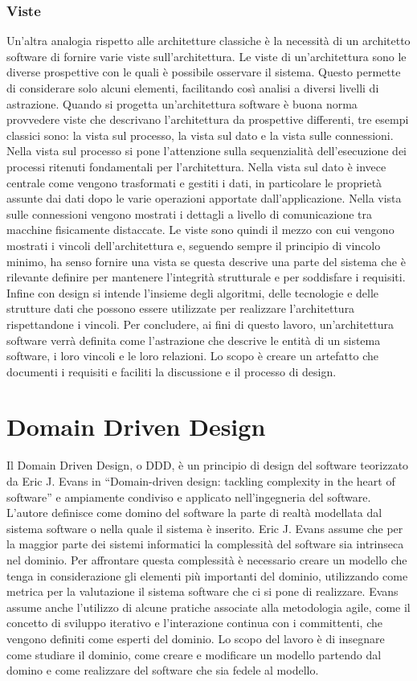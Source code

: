 \documentclass[a4paper,12pt]{report}
\begin{document}
\subsubsection{Viste}
Un'altra analogia rispetto alle architetture classiche è la necessità di un architetto software di fornire varie viste sull'architettura.
Le viste di un'architettura sono le diverse prospettive con le quali è possibile osservare il sistema. 
Questo permette di considerare solo alcuni elementi, facilitando così analisi a diversi livelli di astrazione.
Quando si progetta un'architettura software è buona norma provvedere viste che descrivano l'architettura da prospettive differenti, tre esempi classici sono: la vista sul processo, la vista sul dato e la vista sulle connessioni.
Nella vista sul processo si pone l'attenzione sulla sequenzialità dell'esecuzione dei processi ritenuti fondamentali per l'architettura.
Nella vista sul dato è invece centrale come vengono trasformati e gestiti i dati, in particolare le proprietà assunte dai dati dopo le varie operazioni apportate dall'applicazione.
Nella vista sulle connessioni vengono mostrati i dettagli a livello di comunicazione tra macchine fisicamente distaccate. 
Le viste sono quindi il mezzo con cui vengono mostrati i vincoli dell'architettura e, seguendo sempre il principio di vincolo minimo, ha senso fornire una vista se questa descrive una parte del sistema che è rilevante definire per mantenere l'integrità strutturale e per soddisfare i requisiti. 
Infine con design si intende l'insieme degli algoritmi, delle tecnologie e delle strutture dati che possono essere utilizzate per realizzare l'architettura rispettandone i vincoli. 
Per concludere, ai fini di questo lavoro, un'architettura software verrà definita come l'astrazione che descrive le entità di un sistema software, i loro vincoli e le loro relazioni.
Lo scopo è creare un artefatto che documenti i requisiti e faciliti la discussione e il processo di design.

\section{Domain Driven Design}\label{DDD}
Il Domain Driven Design, o DDD, è un principio di design del software teorizzato da Eric J. Evans in ``Domain-driven design: tackling complexity in the heart of software'' \cite{evans_domain-driven_2004} e ampiamente condiviso e applicato nell'ingegneria del software. 
L'autore definisce come domino del software la parte di realtà modellata dal sistema software o nella quale il sistema è inserito.
Eric J. Evans assume che per la maggior parte dei sistemi informatici la complessità del software sia intrinseca nel dominio.
Per affrontare questa complessità è necessario creare un modello che tenga in considerazione gli elementi più importanti del dominio, utilizzando come metrica per la valutazione il sistema software che ci si pone di realizzare. 
Evans assume anche l'utilizzo di alcune pratiche associate alla metodologia agile, come il concetto di sviluppo iterativo e l'interazione continua con i committenti, che vengono definiti come esperti del dominio.
Lo scopo del lavoro è di insegnare come studiare il dominio, come creare e modificare un modello partendo dal domino e come realizzare del software che sia fedele al modello.
\end{document}

